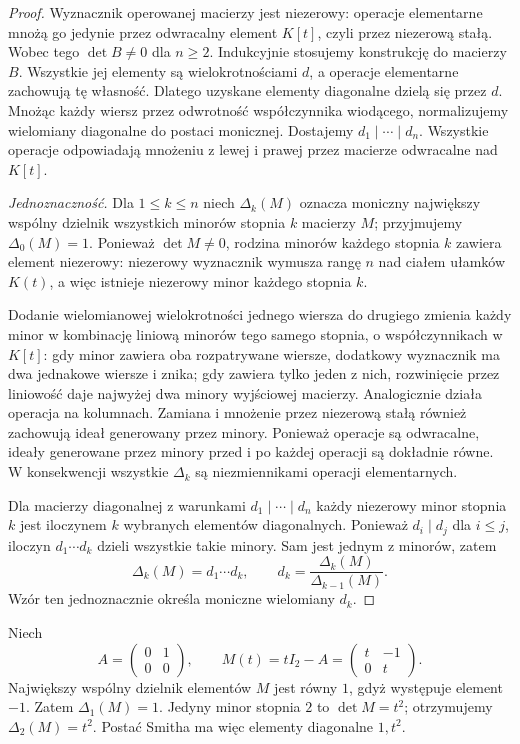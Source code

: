 \begin{proof}
Wyznacznik operowanej macierzy
jest niezerowy: operacje elementarne
mnożą go jedynie przez odwracalny
element \(K[t]\), czyli przez
niezerową stałą.
Wobec tego \(\det B\ne0\)
dla \(n\ge2\).
Indukcyjnie stosujemy konstrukcję
do macierzy \(B\).
Wszystkie jej elementy są wielokrotnościami
\(d\), a operacje elementarne zachowują
tę własność. Dlatego uzyskane
elementy diagonalne dzielą się przez \(d\).
Mnożąc każdy wiersz przez odwrotność
współczynnika wiodącego, normalizujemy
wielomiany diagonalne do postaci monicznej.
Dostajemy \(d_1\mid\cdots\mid d_n\).
Wszystkie operacje odpowiadają
mnożeniu z lewej i prawej
przez macierze odwracalne nad \(K[t]\).

\emph{Jednoznaczność.}
Dla \(1\le k\le n\) niech \(\Delta_k(M)\)
oznacza moniczny największy wspólny dzielnik
wszystkich minorów stopnia \(k\) macierzy \(M\);
przyjmujemy \(\Delta_0(M)=1\).
Ponieważ \(\det M\ne0\),
rodzina minorów każdego stopnia \(k\)
zawiera element niezerowy:
niezerowy wyznacznik wymusza
rangę \(n\) nad ciałem ułamków \(K(t)\),
a więc istnieje niezerowy minor
każdego stopnia \(k\).

Dodanie wielomianowej wielokrotności
jednego wiersza do drugiego
zmienia każdy minor w kombinację liniową
minorów tego samego stopnia,
o współczynnikach w \(K[t]\):
gdy minor zawiera oba rozpatrywane wiersze,
dodatkowy wyznacznik ma dwa jednakowe wiersze
i znika; gdy zawiera tylko jeden z nich,
rozwinięcie przez liniowość daje najwyżej
dwa minory wyjściowej macierzy.
Analogicznie działa operacja na kolumnach.
Zamiana i mnożenie przez niezerową stałą
również zachowują ideał generowany przez minory.
Ponieważ operacje są odwracalne,
ideały generowane przez minory przed
i po każdej operacji są dokładnie równe.
W konsekwencji wszystkie \(\Delta_k\)
są niezmiennikami operacji elementarnych.

Dla macierzy diagonalnej z warunkami
\(d_1\mid\cdots\mid d_n\)
każdy niezerowy minor stopnia \(k\)
jest iloczynem \(k\) wybranych
elementów diagonalnych.
Ponieważ \(d_i\mid d_j\) dla \(i\le j\),
iloczyn \(d_1\cdots d_k\)
dzieli wszystkie takie minory.
Sam jest jednym z minorów,
zatem
\[
 \Delta_k(M)=d_1\cdots d_k,\qquad
 d_k=\frac{\Delta_k(M)}{\Delta_{k-1}(M)}.
\]
Wzór ten jednoznacznie określa
moniczne wielomiany \(d_k\).
\end{proof}

\begin{przyklad}
\label{prz:lin19-smith-jordan}
Niech
\[
 A=\begin{pmatrix}0&1\\0&0\end{pmatrix},
 \qquad
 M(t)=tI_2-A=\begin{pmatrix}t&-1\\0&t\end{pmatrix}.
\]
Największy wspólny dzielnik
elementów \(M\) jest równy \(1\),
gdyż występuje element \(-1\).
Zatem \(\Delta_1(M)=1\).
Jedyny minor stopnia \(2\)
to \(\det M=t^2\);
otrzymujemy \(\Delta_2(M)=t^2\).
Postać Smitha ma więc
elementy diagonalne \(1,t^2\).
\end{przyklad}

